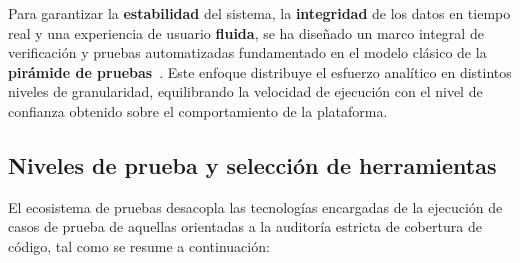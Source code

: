 Para garantizar la \textbf{estabilidad} del sistema, la \textbf{integridad} de los datos en tiempo real y una experiencia de usuario \textbf{fluida}, se ha diseñado un marco integral de verificación y pruebas automatizadas fundamentado en el modelo clásico de la \textbf{pirámide de pruebas}~\cite{cohn2009succeeding}. Este enfoque distribuye el esfuerzo analítico en distintos niveles de granularidad, equilibrando la velocidad de ejecución con el nivel de confianza obtenido sobre el comportamiento de la plataforma.

\subsection{Niveles de prueba y selección de herramientas}\label{subsec:niveles_herramientas}

El ecosistema de pruebas desacopla las tecnologías encargadas de la ejecución de casos de prueba de aquellas orientadas a la auditoría estricta de cobertura de código, tal como se resume a continuación:

\begin{table}[H]
  \centering
  \small
  \renewcommand{\arraystretch}{1.3}
  \caption{Clasificación de niveles de prueba y herramientas del sistema.}
  \label{tab:herramientas_pruebas}
\end{table}

